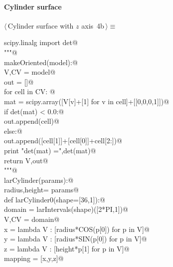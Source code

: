 \documentclass[11pt,oneside]{article}	%
\begin{document}
\paragraph{Cylinder surface}
\begin{flushleft} \small \label{scrap9}
\protect{}$\langle\,$Cylinder surface with $z$ axis\nobreak\ {\footnotesize 4b}$\,\rangle\equiv$
\vspace{-1ex}
\begin{list}{}{} \item
\mbox{}\verb@from scipy.linalg import det@\\
\mbox{}\verb@"""@\\
\mbox{}\verb@def makeOriented(model):@\\
\mbox{}\verb@   V,CV = model@\\
\mbox{}\verb@   out = []@\\
\mbox{}\verb@   for cell in CV: @\\
\mbox{}\verb@      mat = scipy.array([V[v]+[1] for v in cell]+[[0,0,0,1]])@\\
\mbox{}\verb@      if det(mat) < 0.0:@\\
\mbox{}\verb@         out.append(cell)@\\
\mbox{}\verb@      else:@\\
\mbox{}\verb@         out.append([cell[1]]+[cell[0]]+cell[2:])@\\
\mbox{}\verb@      print "\n det(mat) =",det(mat)@\\
\mbox{}\verb@   return V,out@\\
\mbox{}\verb@"""@\\
\mbox{}\verb@def larCylinder(params):@\\
\mbox{}\verb@   radius,height= params@\\
\mbox{}\verb@   def larCylinder0(shape=[36,1]):@\\
\mbox{}\verb@      domain = larIntervals(shape)([2*PI,1])@\\
\mbox{}\verb@      V,CV = domain@\\
\mbox{}\verb@      x = lambda V : [radius*COS(p[0]) for p in V]@\\
\mbox{}\verb@      y = lambda V : [radius*SIN(p[0]) for p in V]@\\
\mbox{}\verb@      z = lambda V : [height*p[1] for p in V]@\\
\mbox{}\verb@      mapping = [x,y,z]@\\

\end{list}
\end{flushleft}
\end{document}
